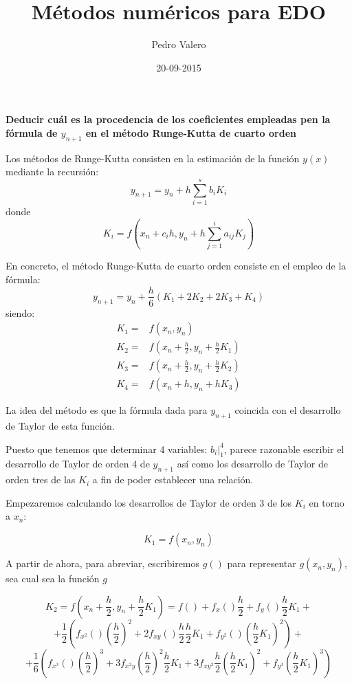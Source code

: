 \documentclass[nochap]{apuntes}
\title{Métodos numéricos para EDO}
\author{Pedro Valero}
\date{20-09-2015}
\begin{document}
\pagestyle{plain}

\textbf{Deducir cuál es la procedencia de los coeficientes empleadas pen la fórmula de $y_{n+1}$ en el método Runge-Kutta de cuarto orden}

Los métodos de Runge-Kutta consisten en la estimación de la función $y(x)$ mediante la recursión:
\[y_{n+1} = y_n+ h \sum_{i=1}^s b_i K_i\]
donde
\[K_i = f\left(x_n+c_ih, y_n+h \sum_{j=1}^ia_{ij}K_j\right)\]

En concreto, el método Runge-Kutta de cuarto orden consiste en el empleo de la fórmula:
\[y_{n+1} = y_n +\frac{h}{6}(K_1+2K_2+2K_3+K_4)\]
siendo:
\[
\begin{array}{ll}
K_1 = & f(x_n,y_n)\\
K_2 = & f(x_n+\frac{h}{2}, y_n+\frac{h}{2}K_1)\\
K_3 = & f(x_n+\frac{h}{2}, y_n + \frac{h}{2}K_2)\\
K_4 = & f(x_n+h, y_n + h K_3)
\end{array}
\]

La idea del método es que la fórmula dada para $y_{n+1}$ coincida con el desarrollo de Taylor de esta función.

Puesto que tenemos que determinar 4 variables: $b_i|_1^4$, parece razonable escribir el desarrollo de Taylor de orden 4 de $y_{n+1}$ así como los desarrollo de Taylor de orden tres de las $K_i$ a fin de poder establecer una relación.


Empezaremos calculando los desarrollos de Taylor de orden 3 de los $K_i$ en torno a $x_n$:

\[K_1 = f(x_n,y_n)\]

\begin{remark}
A partir de ahora, para abreviar, escribiremos $g()$ para representar $g(x_n,y_n)$, sea cual sea la función $g$
\end{remark}

\[K_2 = f\left(x_n+\frac{h}{2},y_n+\frac{h}{2}K_1\right)=f()+f_x()\frac{h}{2}+f_y()\frac{h}{2}K_1 +\]
\[+ \frac{1}{2}\left( f_{x^2}()\left(\frac{h}{2}\right)^2 +2 f_{xy}()\frac{h}{2}\frac{h}{2}K_1 +f_{y^2}()\left(\frac{h}{2}K_1\right)^2\right) +\]
\[+   \frac{1}{6}\left( f_{x^3}()\left(\frac{h}{2}\right)^3 + 3f_{x^2y}\left(\frac{h}{2}\right)^2\frac{h}{2}K_1 + 3f_{xy^2}\frac{h}{2}\left(\frac{h}{2}K_1\right)^2 + f_{y^3}\left(\frac{h}{2}K_1\right)^3\right)\]
\end{document}
